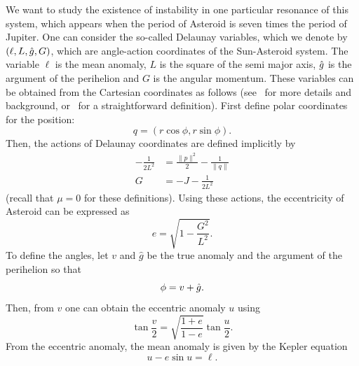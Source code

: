 We want to study the existence of instability in one particular
resonance of this system, which appears when the period of Asteroid is
seven times the period of Jupiter. One can consider the so-called
Delaunay variables, which we denote by $(\ell, L, \hat g, G)$, which are
angle-action coordinates of the Sun-Asteroid system. The variable
$\ell$ is the mean anomaly, $L$ is the square of the semi major axis,
$\hat g$ is the argument of the perihelion and $G$ is the angular
momentum. These variables can be obtained from the Cartesian
coordinates as follows (see~\cite{ArnoldKN88} for more details and
background, or~\cite[Appendix]{Fejoz:2010} for a straightforward
definition). First define polar coordinates for the position:
\[
q=(r\cos\phi,r\sin\phi).
\]
Then, the actions of Delaunay coordinates are defined implicitly by
\begin{align}
  -\frac{1}{2L^2}&=\frac{\|p\|^2}{2}-\frac{1}{\|q\|}\label{def:L}\\
  G&=-J-\frac{1}{2L^2}\label{def:G}
\end{align}
(recall that $\mu=0$ for these definitions). Using these actions, the
eccentricity of Asteroid can be expressed as
\begin{equation}\label{def:eccentricity}
  e=\sqrt{1-\frac{G^2}{L^2}}.
\end{equation}
To define the angles, let $v$ and $\hat g$ be the true anomaly and the
argument of the perihelion so that
\begin{equation}\label{def:Angles}
  \phi=v+\hat g.
\end{equation}
Then, from $v$ one can obtain the eccentric anomaly $u$ using
\begin{equation}
  \tan\frac{v}{2}=\sqrt{\frac{1+e}{1-e}}\tan\frac{u}{2}.
\end{equation}
From the eccentric anomaly, the mean anomaly is given by the Kepler equation
\begin{equation}\label{def:MeanAnomaly}
  u-e\sin u=\ell.
\end{equation}

